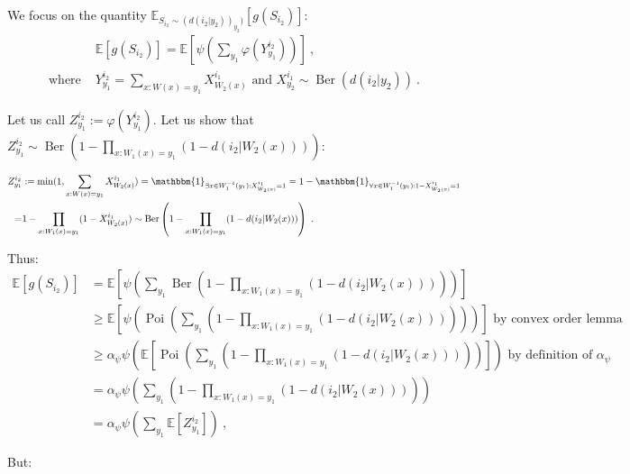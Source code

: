 \documentclass[11pt]{article}
\theoremstyle{definition}
\theoremstyle{remark}
\DeclareMathOperator{\Poi}{\text{Poi}}
\DeclareMathOperator{\Ber}{\text{Ber}}
\begin{document}
We focus on the quantity $\mathbb{E}_{S_{i_2} \sim (d(i_2|y_2))_{y_2})}\left[g(S_{i_2})\right]$:
\begin{equation}
  \begin{aligned}
    &\mathbb{E}\left[g(S_{i_2})\right] = \mathbb{E}\left[\psi\left(\sum_{y_1}\varphi(Y^{i_2}_{y_1})\right)\right] \ ,\\
    \text{where } &Y^{i_2}_{y_1} = \sum_{x:W(x)=y_1}X^{i_1}_{W_2(x)} \text{ and } X^{i_1}_{y_2} \sim \Ber(d(i_2|y_2))\ .
  \end{aligned}
\end{equation}

Let us call $Z^{i_2}_{y_1} := \varphi(Y^{i_2}_{y_1})$. Let us show that $Z^{i_2}_{y_1} \sim \Ber\left(1 - \prod_{x:W_1(x)=y_1}(1-d(i_2|W_2(x)))\right)$:

\begin{equation}
  \begin{aligned}
    Z^{i_2}_{y_1} &:= \min(1,\sum_{x:W(x)=y_1}X^{i_1}_{W_2(x)}) = \mathbbm{1}_{\exists x \in W_1^{-1}(y_1): X^{i_1}_{W_2(x)} = 1} = 1 - \mathbbm{1}_{\forall x \in W_1^{-1}(y_1): 1-X^{i_1}_{W_2(x)} = 1}\\
    =& 1 - \prod_{x:W_1(x)=y_1} (1-X^{i_1}_{W_2(x)}) \sim \Ber\left(1 - \prod_{x:W_1(x)=y_1}(1-d(i_2|W_2(x)))\right) \ .
  \end{aligned}
\end{equation}

Thus:
\begin{equation}
  \begin{aligned}
    \mathbb{E}\left[g(S_{i_2})\right]& = \mathbb{E}\left[\psi\left(\sum_{y_1}\Ber\left(1 - \prod_{x:W_1(x)=y_1}(1-d(i_2|W_2(x)))\right)\right)\right]\\
    &\geq  \mathbb{E}\left[\psi\left(\Poi\left(\sum_{y_1}\left(1 - \prod_{x:W_1(x)=y_1}(1-d(i_2|W_2(x)))\right)\right)\right)\right] \text{ by convex order lemma}\\
    &\geq \alpha_{\psi}\psi\left(\mathbb{E}\left[\Poi\left(\sum_{y_1}\left(1 - \prod_{x:W_1(x)=y_1}(1-d(i_2|W_2(x)))\right)\right)\right]\right)  \text{ by definition of $\alpha_{\psi}$}\\
    &= \alpha_{\psi}\psi\left(\sum_{y_1}\left(1 - \prod_{x:W_1(x)=y_1}(1-d(i_2|W_2(x)))\right)\right)\\
    &= \alpha_{\psi}\psi\left(\sum_{y_1}\mathbb{E}[Z^{i_2}_{y_1}]\right)\ ,
  \end{aligned}
\end{equation}

But:
\end{document}
